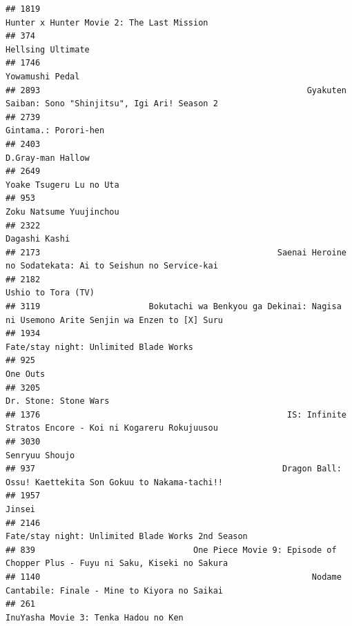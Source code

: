 \documentclass[
]{article}
\begin{document}
\begin{verbatim}
## 1819                                                                 Hunter x Hunter Movie 2: The Last Mission
## 374                                                                                          Hellsing Ultimate
## 1746                                                                                           Yowamushi Pedal
## 2893                                                      Gyakuten Saiban: Sono "Shinjitsu", Igi Ari! Season 2
## 2739                                                                                      Gintama.: Porori-hen
## 2403                                                                                         D.Gray-man Hallow
## 2649                                                                                   Yoake Tsugeru Lu no Uta
## 953                                                                                    Zoku Natsume Yuujinchou
## 2322                                                                                             Dagashi Kashi
## 2173                                                Saenai Heroine no Sodatekata: Ai to Seishun no Service-kai
## 2182                                                                                        Ushio to Tora (TV)
## 3119                      Bokutachi wa Benkyou ga Dekinai: Nagisa ni Usemono Arite Senjin wa Enzen to [X] Suru
## 1934                                                                    Fate/stay night: Unlimited Blade Works
## 925                                                                                                   One Outs
## 3205                                                                                     Dr. Stone: Stone Wars
## 1376                                                  IS: Infinite Stratos Encore - Koi ni Kogareru Rokujuusou
## 3030                                                                                            Senryuu Shoujo
## 937                                                  Dragon Ball: Ossu! Kaettekita Son Gokuu to Nakama-tachi!!
## 1957                                                                                                    Jinsei
## 2146                                                         Fate/stay night: Unlimited Blade Works 2nd Season
## 839                                One Piece Movie 9: Episode of Chopper Plus - Fuyu ni Saku, Kiseki no Sakura
## 1140                                                       Nodame Cantabile: Finale - Mine to Kiyora no Saikai
## 261                                                                       InuYasha Movie 3: Tenka Hadou no Ken

\end{verbatim}
\end{document}
